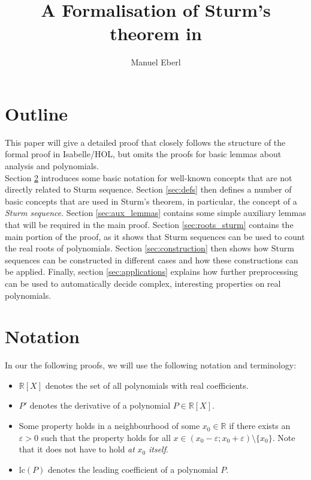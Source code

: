 \documentclass[11pt,a4paper,oneside]{article}
\title{A Formalisation of Sturm's theorem in \isabellehol}
\author{Manuel Eberl}
\newcommand{\RR}{\mathbb{R}}
\renewcommand{\epsilon}{\varepsilon}
\newcommand{\isabellehol}{\mbox{Isabelle}\slash HOL\xspace}
\begin{document}
\maketitle
\tableofcontents
\newpage
\parindent0mm

\section{Outline}

This paper will give a detailed proof that closely follows the structure of the formal proof in \isabellehol, but omits the proofs for basic lemmas about analysis and polynomials.\\

Section \ref{sec:notation} introduces some basic notation for well-known concepts that are not directly related to Sturm sequence. Section \ref{sec:defs} then defines a number of basic concepts that are used in Sturm's theorem, in particular, the concept of a \emph{Sturm sequence}. Section \ref{sec:aux_lemmas} contains some simple auxiliary lemmas that will be required in the main proof. Section \ref{sec:roots_sturm} contains the main portion of the proof, as it shows that Sturm sequences can be used to count the real roots of polynomials. Section \ref{sec:construction} then shows how Sturm sequences can be constructed in different cases and how these constructions can be applied. Finally, section \ref{sec:applications} explains how further preprocessing can be used to automatically decide complex, interesting properties on real polynomials.

\section{Notation}
\label{sec:notation}
In our the following proofs, we will use the following notation and terminology:
\begin{itemize}
\item $\RR[X]$ denotes the set of all polynomials with real coefficients.
\item $P'$ denotes the derivative of a polynomial $P\in\RR[X]$.
\item Some property holds in a neighbourhood of some $x_0\in\RR$ if there exists an $\epsilon > 0$ such that the property holds for all $x\in (x_0-\epsilon;x_0+\epsilon)\setminus\{x_0\}$. Note that it does not have to hold \emph{at} $x_0$ \emph{itself}.
\item $\mathrm{lc}(P)$ denotes the leading coefficient of a polynomial $P$.
\end{itemize}
\end{document}
